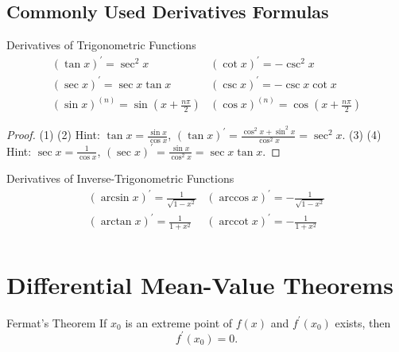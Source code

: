 \subsection{Commonly Used Derivatives Formulas}

\begin{proposition}{Derivatives of Trigonometric Functions}{}
  \begin{equation}
    \begin{array}{ll}
      (\tan x)^{\prime} = \sec^2 x & (\cot x)^{\prime} = - \csc^2 x\\
      (\sec x)^{\prime} = \sec x \tan x&  (\csc x)^{\prime} = - \csc x \cot x\\
      (\sin x)^{(n)} = \sin \left( x + \frac{n\pi}{2} \right)&(\cos x)^{(n)} = \cos \left( x + \frac{n\pi}{2}\right)
    \end{array}
  \end{equation}
\end{proposition}

\begin{proof}
  (1) (2) Hint: $\tan x = \frac{\sin x}{\cos x}$, $(\tan x)^{\prime} =
  \frac{\cos^2 x + \sin^2 x}{\cos^2 x} = \sec^2 x$.
  (3) (4) Hint: $\sec x = \frac{1}{\cos x}$,
  $(\sec x)^{\prime} = \frac{\sin x}{\cos^2 x} = \sec x \tan x$.
\end{proof}

\begin{proposition}{Derivatives of Inverse-Trigonometric Functions}{}
  \begin{equation}
    \begin{array}{ll}
      (\arcsin x)^{\prime} = \frac{1}{\sqrt{1 - x^2}} & (\arccos x)^{\prime} = - \frac{1}{\sqrt{1 - x^2}} \\
      (\arctan x)^{\prime} = \frac{1}{1 + x^2} & (\operatorname{arccot} x)^{\prime} = - \frac{1}{1 + x^2} \\
    \end{array}
  \end{equation}
\end{proposition}

\section{Differential Mean-Value Theorems}

\begin{theorem}{Fermat's Theorem}{}
  If $x_0$ is an extreme point of $f(x)$ and $f^{\prime}(x_0)$ exists,
  then
  \begin{equation}
    f^{\prime}(x_0) = 0.
  \end{equation}
\end{theorem}

